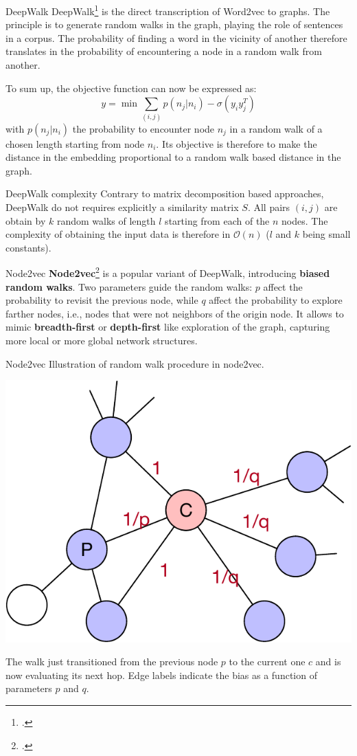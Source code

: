 \documentclass[a4paper,11pt]{book}
\begin{document}
\begin{textbox}{DeepWalk}
DeepWalk\footcite{perozzi2014deepwalk} is the direct transcription of Word2vec to graphs. The principle is to generate random walks in the graph, playing the role of sentences in a corpus. The probability of finding a word in the vicinity of another therefore translates in the probability of encountering a node in a random walk from another.

To sum up, the objective function can now be expressed as:
\[
y=\min \sum_{(i,j)} p(n_j|n_i)-\sigma(y_i y_j^T)
\]
with $p(n_j|n_i)$ the probability to encounter node $n_j$ in a random walk of a chosen length starting from node $n_i$. Its objective is therefore to make the distance in the embedding proportional to a random walk based distance in the graph.
\end{textbox}

\begin{textbox}{DeepWalk complexity}
Contrary to matrix decomposition based approaches, DeepWalk do not requires explicitly a similarity matrix $S$. All pairs $(i,j)$ are obtain by $k$ random walks of length $l$ starting from each of the $n$ nodes. The complexity of obtaining the input data is therefore in $\mathcal{O}(n)$ ($l$ and $k$ being small constants).
\end{textbox}

\begin{textbox}{Node2vec}
\textbf{Node2vec}\footcite{grover2016node2vec} is a popular variant of DeepWalk, introducing \textbf{biased random walks}. Two parameters guide the random walks: $p$ affect the probability to revisit the previous node, while $q$ affect the probability to explore farther nodes, i.e., nodes that were not neighbors of the origin node. It allows to mimic \textbf{breadth-first} or \textbf{depth-first} like exploration of the graph, capturing more local or more global network structures.
\end{textbox}

\begin{textbox}{Node2vec}
Illustration of random walk procedure in node2vec. 

\centering
\includegraphics[width=0.6\linewidth]{pics/n2v.pdf}


The walk just transitioned from the previous node $p$ to the current one $c$ and is now evaluating its next hop. Edge labels indicate the bias as a function of parameters $p$ and $q$.
\end{textbox}
\end{document}
